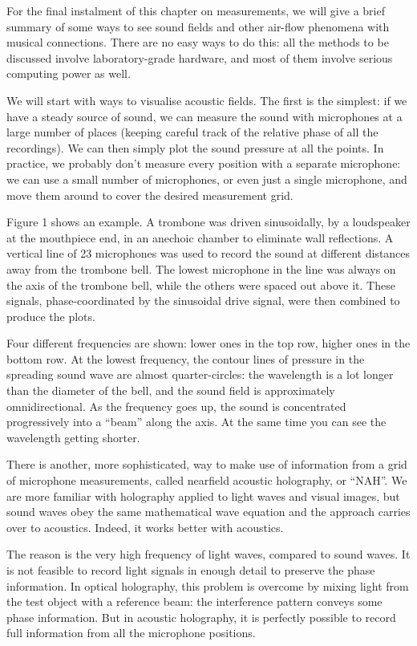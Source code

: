 

  For the final instalment of this chapter on measurements, we will give a 
  brief summary of some ways to see sound fields and other air-flow phenomena 
  with musical connections. There are no easy ways to do this: all the methods 
  to be discussed involve laboratory-grade hardware, and most of them involve 
  serious computing power as well. 

  We will start with ways to visualise acoustic fields. The first is the 
  simplest: if we have a steady source of sound, we can measure the sound with 
  microphones at a large number of places (keeping careful track of the 
  relative phase of all the recordings). We can then simply plot the sound 
  pressure at all the points. In practice, we probably don’t measure every 
  position with a separate microphone: we can use a small number of 
  microphones, or even just a single microphone, and move them around to cover 
  the desired measurement grid. 

  Figure 1 shows an example. A trombone was driven sinusoidally, by a 
  loudspeaker at the mouthpiece end, in an anechoic chamber to eliminate wall 
  reflections. A vertical line of 23 microphones was used to record the sound 
  at different distances away from the trombone bell. The lowest microphone in 
  the line was always on the axis of the trombone bell, while the others were 
  spaced out above it. These signals, phase-coordinated by the sinusoidal drive 
  signal, were then combined to produce the plots. 

  Four different frequencies are shown: lower ones in the top row, higher ones 
  in the bottom row. At the lowest frequency, the contour lines of pressure in 
  the spreading sound wave are almost quarter-circles: the wavelength is a lot 
  longer than the diameter of the bell, and the sound field is approximately 
  omnidirectional. As the frequency goes up, the sound is concentrated 
  progressively into a “beam” along the axis. At the same time you can see the 
  wavelength getting shorter. 

  There is another, more sophisticated, way to make use of information from a 
  grid of microphone measurements, called nearfield acoustic holography, or 
  “NAH”. We are more familiar with holography applied to light waves and visual 
  images, but sound waves obey the same mathematical wave equation and the 
  approach carries over to acoustics. Indeed, it works better with acoustics. 

  The reason is the very high frequency of light waves, compared to sound 
  waves. It is not feasible to record light signals in enough detail to 
  preserve the phase information. In optical holography, this problem is 
  overcome by mixing light from the test object with a reference beam: the 
  interference pattern conveys some phase information. But in acoustic 
  holography, it is perfectly possible to record full information from all the 
  microphone positions. 

